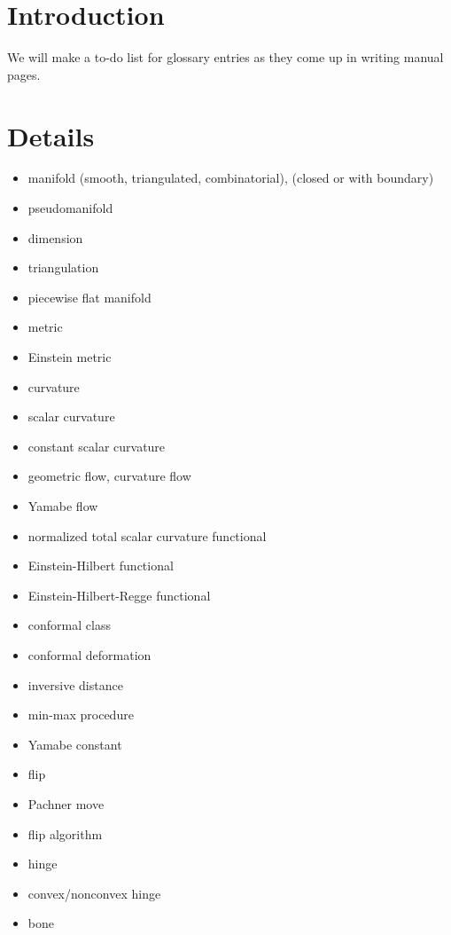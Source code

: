 \documentclass[10pt]{article}%
\begin{document}

\section*{Introduction}

\label{f0}We will make a to-do list for glossary entries as they come up in writing manual pages.

\section*{Details}

\begin{itemize}\item  manifold (smooth, triangulated, combinatorial), (closed or with boundary)
\item  pseudomanifold
\item  dimension
\item  triangulation
\item  piecewise flat manifold
\item  metric
\item  Einstein metric
\item  curvature
\item  scalar curvature
\item  constant scalar curvature
\item  geometric flow, curvature flow
\item  Yamabe flow
\item  normalized total scalar curvature functional
\item  Einstein-Hilbert functional
\item  Einstein-Hilbert-Regge functional
\item  conformal class
\item  conformal deformation
\item  inversive distance
\item  min-max procedure
\item  Yamabe constant
\item  flip
\item  Pachner move
\item  flip algorithm
\item  hinge
\item  convex/nonconvex hinge
\item  bone

\end{itemize}
\end{document}
